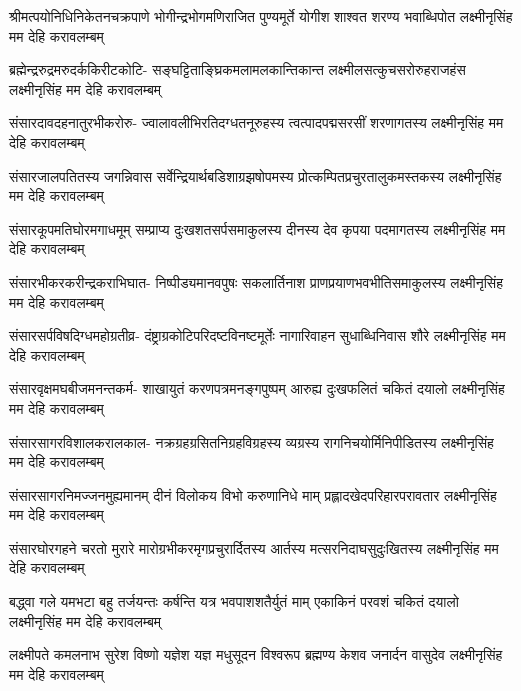 

\fourlineindentedshloka
{श्रीमत्पयोनिधिनिकेतनचक्रपाणे}
{भोगीन्द्रभोगमणिराजित पुण्यमूर्ते}
{योगीश शाश्वत शरण्य भवाब्धिपोत}
{लक्ष्मीनृसिंह मम देहि करावलम्बम् }

\fourlineindentedshloka
{ब्रह्मेन्द्ररुद्रमरुदर्ककिरीटकोटि-}
{सङ्घट्टिताङ्घ्रिकमलामलकान्तिकान्त}
{लक्ष्मीलसत्कुचसरोरुहराजहंस}
{लक्ष्मीनृसिंह मम देहि करावलम्बम्} 

\fourlineindentedshloka
{संसारदावदहनातुरभीकरोरु-}
{ज्वालावलीभिरतिदग्धतनूरुहस्य}
{त्वत्पादपद्मसरसीं शरणागतस्य}
{लक्ष्मीनृसिंह मम देहि करावलम्बम्} 

\fourlineindentedshloka
{संसारजालपतितस्य जगन्निवास}
{सर्वेन्द्रियार्थबडिशाग्रझषोपमस्य}
{प्रोत्कम्पितप्रचुरतालुकमस्तकस्य}
{लक्ष्मीनृसिंह मम देहि करावलम्बम्} 

\fourlineindentedshloka
{संसारकूपमतिघोरमगाधमूम्}
{सम्प्राप्य दुःखशतसर्पसमाकुलस्य}
{दीनस्य देव कृपया पदमागतस्य}
{लक्ष्मीनृसिंह मम देहि करावलम्बम्} 

\fourlineindentedshloka
{संसारभीकरकरीन्द्रकराभिघात-}
{निष्पीड्यमानवपुषः सकलार्तिनाश}
{प्राणप्रयाणभवभीतिसमाकुलस्य}
{लक्ष्मीनृसिंह मम देहि करावलम्बम्} 

\fourlineindentedshloka
{संसारसर्पविषदिग्धमहोग्रतीव्र-}
{दंष्ट्राग्रकोटिपरिदष्टविनष्टमूर्तेः}
{नागारिवाहन सुधाब्धिनिवास शौरे}
{लक्ष्मीनृसिंह मम देहि करावलम्बम्} 

\fourlineindentedshloka
{संसारवृक्षमघबीजमनन्तकर्म-}
{शाखायुतं करणपत्रमनङ्गपुष्पम्}
{आरुह्य दुःखफलितं चकितं दयालो}
{लक्ष्मीनृसिंह मम देहि करावलम्बम्} 

\fourlineindentedshloka
{संसारसागरविशालकरालकाल-}
{नक्रग्रहग्रसितनिग्रहविग्रहस्य}
{व्यग्रस्य रागनिचयोर्मिनिपीडितस्य}
{लक्ष्मीनृसिंह मम देहि करावलम्बम्} 

\fourlineindentedshloka
{संसारसागरनिमज्जनमुह्यमानम्}
{दीनं विलोकय विभो करुणानिधे माम्}
{प्रह्लादखेदपरिहारपरावतार}
{लक्ष्मीनृसिंह मम देहि करावलम्बम्} 

\fourlineindentedshloka
{संसारघोरगहने चरतो मुरारे}
{मारोग्रभीकरमृगप्रचुरार्दितस्य}
{आर्तस्य मत्सरनिदाघसुदुःखितस्य}
{लक्ष्मीनृसिंह मम देहि करावलम्बम्} 

\fourlineindentedshloka
{बद्ध्वा गले यमभटा बहु तर्जयन्तः}
{कर्षन्ति यत्र भवपाशशतैर्युतं माम्}
{एकाकिनं परवशं चकितं दयालो}
{लक्ष्मीनृसिंह मम देहि करावलम्बम्}

\fourlineindentedshloka
{लक्ष्मीपते कमलनाभ सुरेश विष्णो}
{यज्ञेश यज्ञ मधुसूदन विश्वरूप}
{ब्रह्मण्य केशव जनार्दन वासुदेव}
{लक्ष्मीनृसिंह मम देहि करावलम्बम्}

